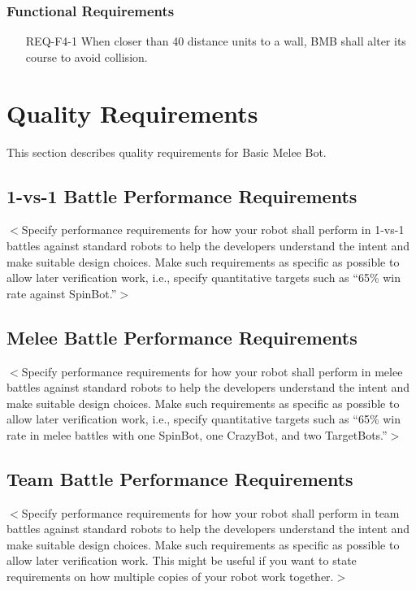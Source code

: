 \documentclass{scrreprt}
\begin{document}
\subsection{Functional Requirements}
\begin{itemize}
\item[REQ-F4-1] When closer than 40 distance units to a wall, BMB shall alter its course to avoid collision.
\end{itemize}

\chapter{Quality Requirements}
This section describes quality requirements for Basic Melee Bot.

\section{1-vs-1 Battle Performance Requirements}
$<$Specify performance requirements for how your robot shall perform in 1-vs-1 battles against standard robots to help the developers understand the intent and make suitable design choices. Make such requirements as specific as possible to allow later verification work, i.e., specify quantitative targets such as ``65\% win rate against SpinBot.''$>$

\section{Melee Battle Performance Requirements}
$<$Specify performance requirements for how your robot shall perform in melee battles against standard robots to help the developers understand the intent and make suitable design choices. Make such requirements as specific as possible to allow later verification work, i.e., specify quantitative targets such as ``65\% win rate in melee battles with one SpinBot, one CrazyBot, and two TargetBots.''$>$

\section{Team Battle Performance Requirements}
$<$Specify performance requirements for how your robot shall perform in team battles against standard robots to help the developers understand the intent and make suitable design choices. Make such requirements as specific as possible to allow later verification work. This might be useful if you want to state requirements on how multiple copies of your robot work together.$>$
\end{document}
